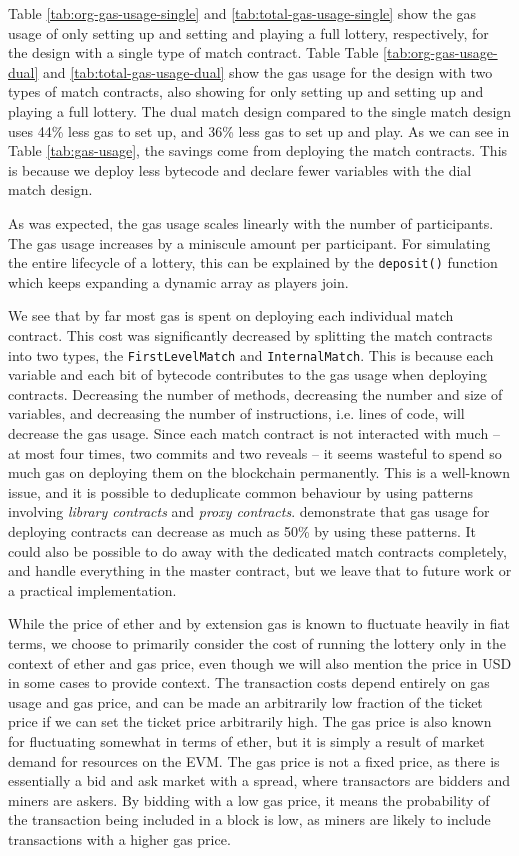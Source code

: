 \noindent
Table \ref{tab:org-gas-usage-single} and \ref{tab:total-gas-usage-single} show the gas usage of only setting up and setting and playing a full lottery, respectively, for the design with a single type of match contract. Table Table \ref{tab:org-gas-usage-dual} and \ref{tab:total-gas-usage-dual} show the gas usage for the design with two types of match contracts, also showing for only setting up and setting up and playing a full lottery.
The dual match design compared to the single match design uses 44\% less gas to set up, and 36\% less gas to set up and play. As we can see in Table \ref{tab:gas-usage}, the savings come from deploying the match contracts. This is because we deploy less bytecode and declare fewer variables with the dial match design.

As was expected, the gas usage scales linearly with the number of participants. The gas usage increases by a miniscule amount per participant. For simulating the entire lifecycle of a lottery, this can be explained by the \texttt{deposit()} function which keeps expanding a dynamic array as players join. 

We see that by far most gas is spent on deploying each individual match contract. This cost was significantly decreased by splitting the match contracts into two types, the \texttt{FirstLevelMatch} and \texttt{InternalMatch}. This is because each variable and each bit of bytecode contributes to the gas usage when deploying contracts. Decreasing the number of methods, decreasing the number and size of variables, and decreasing the number of instructions, i.e. lines of code, will decrease the gas usage. Since each match contract is not interacted with much – at most four times, two commits and two reveals – it seems wasteful to spend so much gas on deploying them on the blockchain permanently. This is a well-known issue, and it is possible to deduplicate common behaviour by using patterns involving \emph{library contracts} and \emph{proxy contracts}. \cite{lu_solidity_2018} demonstrate that gas usage for deploying contracts can decrease as much as 50\% by using these patterns. It could also be possible to do away with the dedicated match contracts completely, and handle everything in the master contract, but we leave that to future work or a practical implementation.

While the price of ether and by extension gas is known to fluctuate heavily in fiat terms, we choose to primarily consider the cost of running the lottery only in the context of ether and gas price, even though we will also mention the price in USD in some cases to provide context. The transaction costs depend entirely on gas usage and gas price, and can be made an arbitrarily low fraction of the ticket price if we can set the ticket price arbitrarily high. The gas price is also known for fluctuating somewhat in terms of ether, but it is simply a result of market demand for resources on the EVM. The gas price is not a fixed price, as there is essentially a bid and ask market with a spread, where transactors are bidders and miners are askers. By bidding with a low gas price, it means the probability of the transaction being included in a block is low, as miners are likely to include transactions with a higher gas price.
